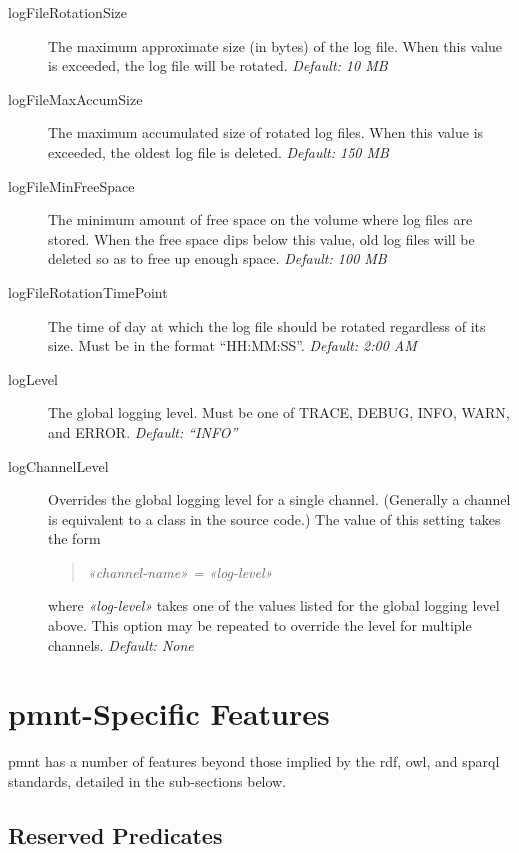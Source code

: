 \begin{description}
	\item[logFileRotationSize] The maximum approximate size (in bytes) of the log file.  When this value is exceeded, the log file will be rotated. \emph{Default: 10 MB}

	\item[logFileMaxAccumSize] The maximum accumulated size of rotated log files.  When this value is exceeded, the oldest log file is deleted. \emph{Default: 150 MB}

	\item[logFileMinFreeSpace] The minimum amount of free space on the volume where log files are stored.  When the free space dips below this value, old log files will be deleted so as to free up enough space. \emph{Default: 100 MB}

	\item[logFileRotationTimePoint] The time of day at which the log file should be rotated regardless of its size.  Must be in the format ``HH:MM:SS''. \emph{Default: 2:00 AM}

	\item[logLevel] The global logging level.  Must be one of TRACE, DEBUG, INFO, WARN, and ERROR. \emph{Default: ``INFO''}

	\item[logChannelLevel] Overrides the global logging level for a single channel.  (Generally a channel is equivalent to a class in the source code.)  The value of this setting takes the form \begin{quote}\emph{«channel-name» = «log-level»}\end{quote} where \emph{«log-level»} takes one of the values listed for the global logging level above.  This option may be repeated to override the level for multiple channels. \emph{Default: None}
\end{description}



\section{\ac{pmnt}-Specific Features}
\label{section-parliament-specific-features}

\ac{pmnt} has a number of features beyond those implied by the \ac{rdf}, \ac{owl}, and \ac{sparql} standards, detailed in the sub-sections below.

\subsection{Reserved Predicates}
\label{section-reserved-predicates}

